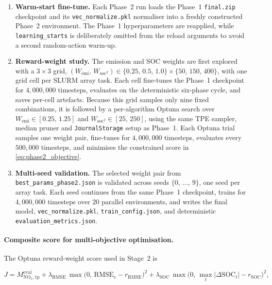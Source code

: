 \begin{enumerate}
  \item \textbf{Warm-start fine-tune.} Each Phase~2 run loads the Phase~1 \texttt{final.zip} checkpoint and its \texttt{vec\_normalize.pkl} normaliser into a freshly constructed Phase~2 environment. The Phase~1 hyperparameters are reapplied, while \texttt{learning\_starts} is deliberately omitted from the reload arguments to avoid a second random-action warm-up.
  \item \textbf{Reward-weight study.} The emission and \ac{SOC} weights are first explored with a $3\!\times\!3$ grid, $(W_{\text{emi}},\,W_{\text{soc}^2}) \in \{0.25,\,0.5,\,1.0\}\times\{50,\,150,\,400\}$, with one grid cell per SLURM array task. Each cell fine-tunes the Phase~1 checkpoint for $4{,}000{,}000$ timesteps, evaluates on the deterministic six-phase cycle, and saves per-cell artefacts. Because this grid samples only nine fixed combinations, it is followed by a per-algorithm Optuna search over $W_{\text{emi}} \in [0.25,\,1.25]$ and $W_{\text{soc}^2} \in [25,\,250]$, using the same \ac{TPE} sampler, median pruner and \texttt{JournalStorage} setup as Phase~1. Each Optuna trial samples one weight pair, fine-tunes for $4{,}000{,}000$ timesteps, evaluates every $500{,}000$ timesteps, and minimises the constrained score in \autoref{eq:phase2_objective}.
  \item \textbf{Multi-seed validation.} The selected weight pair from \texttt{best\_params\_phase2.json} is validated across seeds $\{0,\,\dots,\,9\}$, one seed per array task. Each seed continues from the same Phase~1 checkpoint, trains for $4{,}000{,}000$ timesteps over $20$ parallel environments, and writes the final model, \texttt{vec\_normalize.pkl}, \texttt{train\_config.json}, and deterministic \texttt{evaluation\_metrics.json}.
\end{enumerate}

\paragraph{Composite score for multi-objective optimisation.}
The Optuna reward-weight score used in Stage~2 is

\begin{equation}
  J = M_{\mathrm{NO}_{x},\mathrm{tp}}^{\mathrm{eval}}
  + \lambda_{\text{RMSE}}\,\max\!\bigl(0,\,\mathrm{RMSE}_v - r_{\text{RMSE}}\bigr)^{2}
  + \lambda_{\text{SOC}}\,\max\!\bigl(0,\,\max_t|\Delta\mathrm{SOC}_t| - r_{\text{SOC}}\bigr)^{2},
  \label{eq:phase2_objective}
\end{equation}

